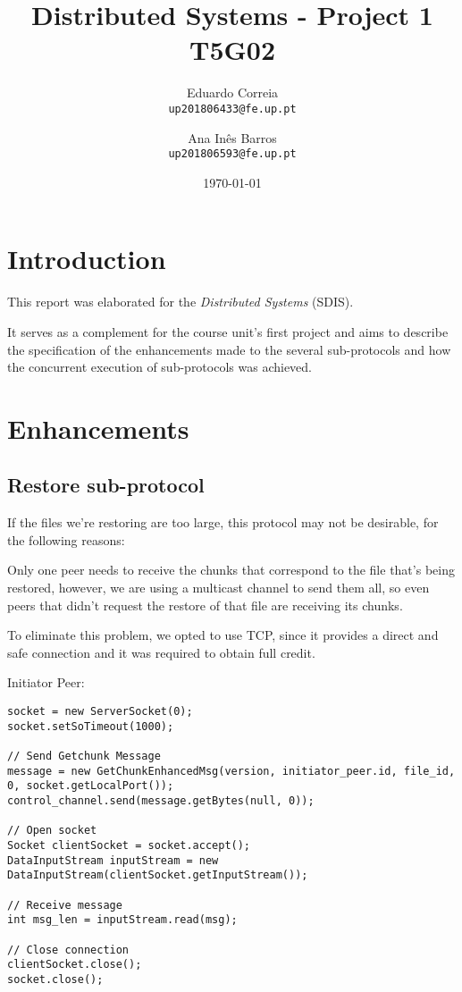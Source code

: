 \documentclass[11pt]{report}
\title{
    \textbf{Distributed Systems - Project 1} \\
    \Large T5G02
}
\author{
    \Large
    Eduardo Correia \\
    \texttt{up201806433@fe.up.pt}
    \and
    \Large
    Ana Inês Barros \\
    \texttt{up201806593@fe.up.pt}
}
\date{\today}
\begin{document}
\maketitle

\chapter{Introduction}

This report was elaborated for the \textit{Distributed Systems} (SDIS).

It serves as a complement for the course unit's first project and aims to describe the specification of the enhancements made to the several sub-protocols and how the concurrent execution of sub-protocols was achieved.

\chapter{Enhancements}

\section{Restore sub-protocol}

If the files we're restoring are too large, this protocol may not be desirable, for the following reasons:

Only one peer needs to receive the chunks that correspond to the file that's being restored, however, we are using a multicast channel to send them all, so even peers that didn't request the restore of that file are receiving its chunks.

To eliminate this problem, we opted to use TCP, since it provides a direct and safe connection and it was required to obtain full credit.

Initiator Peer:

\begin{verbatim}
socket = new ServerSocket(0);
socket.setSoTimeout(1000);

// Send Getchunk Message
message = new GetChunkEnhancedMsg(version, initiator_peer.id, file_id, 0, socket.getLocalPort());
control_channel.send(message.getBytes(null, 0));

// Open socket
Socket clientSocket = socket.accept();
DataInputStream inputStream = new DataInputStream(clientSocket.getInputStream());

// Receive message
int msg_len = inputStream.read(msg);

// Close connection
clientSocket.close();
socket.close();
\end{verbatim}
\end{document}

